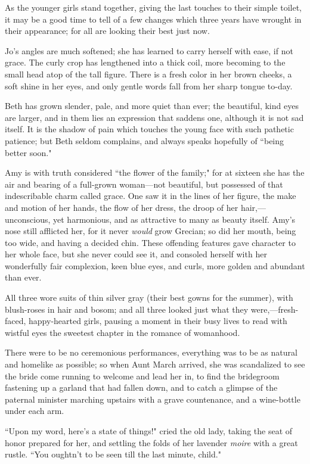As the younger girls stand together, giving the last touches to their
simple toilet, it may be a good time to tell of a few changes which
three years have wrought in their appearance; for all are looking their
best just now.

Jo's angles are much softened; she has learned to carry
herself with ease, if not grace. The curly crop has lengthened into a
thick coil, more becoming to the small head atop of the tall figure.
There is a fresh color in her brown cheeks, a soft shine in her eyes,
and only gentle words fall from her sharp tongue to-day.

Beth has grown slender, pale, and more quiet than ever; the beautiful,
kind eyes are larger, and in them lies an expression that saddens one,
although it is not sad itself. It is the shadow of pain which touches
the young face with such pathetic patience; but Beth seldom complains,
and always speaks hopefully of ``being better soon."

Amy is with truth considered ``the flower of the family;" for at sixteen
she has the air and bearing of a full-grown woman---not beautiful, but
possessed of that indescribable charm called grace. One saw it in the
lines of her figure, the make and motion of her hands, the flow of her
dress, the droop of her hair,---unconscious, yet harmonious, and as
attractive to many as beauty itself. Amy's nose still
afflicted her, for it never \emph{would} grow Grecian; so did her mouth,
being too wide, and having a decided chin. These offending features gave
character to her whole face, but she never could see it, and consoled
herself with her wonderfully fair complexion, keen blue eyes, and curls,
more golden and abundant than ever.

All three wore suits of thin silver gray (their best gowns for the
summer), with blush-roses in hair and bosom; and all three looked just
what they were,---fresh-faced, happy-hearted girls, pausing a moment in
their busy lives to read with wistful eyes the sweetest chapter in the
romance of womanhood.

There were to be no ceremonious performances, everything was to be as
natural and homelike as possible; so when Aunt March arrived, she was
scandalized to see the bride come running to welcome and lead her in, to
find the bridegroom fastening up a garland that had fallen down, and to
catch a glimpse of the paternal minister marching upstairs with a grave
countenance, and a wine-bottle under each arm.

``Upon my word, here's a state of things!" cried the old
lady, taking the seat of honor prepared for her, and settling the folds
of her lavender \emph{moire} with a great rustle. ``You
oughtn't to be seen till the last minute, child."

